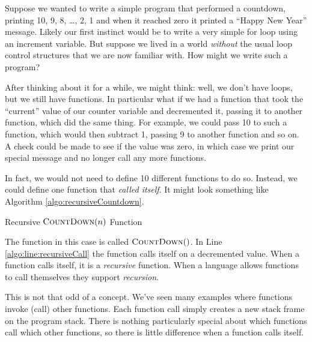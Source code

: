 

Suppose we wanted to write a simple program that performed a 
countdown, printing
10, 9, 8, \ldots, 2, 1 and when it reached zero it printed a ``Happy
New Year'' message.  Likely our first instinct would be to write a 
very simple for loop using an increment variable.  But suppose
we lived in a world \emph{without} the usual loop control structures 
that we are now
familiar with.  How might we write such a program?

After thinking about it for a while, we might think: well, we don't have
loops, but we still have functions.  In particular what if we had a function
that took the ``current'' value of our counter variable and decremented it, 
passing it to another function, which did the same thing.  For example, we 
could pass 10 to such a function, which would then subtract 1, passing 9
to another function and so on.  A check could be made to see if the value was 
zero, in which case we print our special message and no longer call any more 
functions.

In fact, we would not need to define 10 different functions to do so.  Instead, 
we could define one function that \emph{called itself}.  It might look something
like Algorithm \ref{algo:recursiveCountdown}.

\begin{algorithm}[H]
 
\caption{Recursive $\textsc{CountDown}(n)$ Function}
\label{algo:recursiveCountdown}
\end{algorithm}

The function in this case is called $\textsc{CountDown}()$.  In Line 
\ref{algo:line:recursiveCall} the function calls itself on a decremented
value.  When a function calls itself, it is a \emph{recursive} function.
When a language allows functions to call themselves they support 
\emph{recursion}.

This is not that odd of a concept.  We've seen many examples where 
functions invoke (call) other functions.  Each function call simply 
creates a new stack frame on the program stack.  There is nothing 
particularly special about which functions call which other functions, 
so there is little difference when a function calls itself. 

